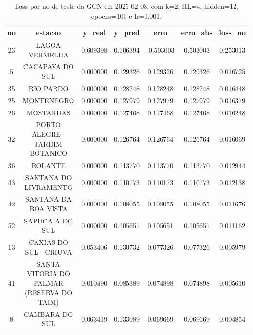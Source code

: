 \begin{table}[h]
\centering
\caption{Loss por no de teste da GCN em 2025-02-08, com k=2, HL=4, hidden=12, epochs=100 e lr=0.001.}
\label{tab:gcn_loss_k2_hl4_h12_e100_d20250208}
\begin{tabular}{ccccccc}
\toprule
no & estacao & y\_real & y\_pred & erro & erro\_abs & loss\_no \\
\midrule
23 & LAGOA VERMELHA & 0.609398 & 0.106394 & -0.503003 & 0.503003 & 0.253013 \\
5 & CACAPAVA DO SUL & 0.000000 & 0.129326 & 0.129326 & 0.129326 & 0.016725 \\
35 & RIO PARDO & 0.000000 & 0.128248 & 0.128248 & 0.128248 & 0.016448 \\
25 & MONTENEGRO & 0.000000 & 0.127979 & 0.127979 & 0.127979 & 0.016379 \\
26 & MOSTARDAS & 0.000000 & 0.127468 & 0.127468 & 0.127468 & 0.016248 \\
32 & PORTO ALEGRE - JARDIM BOTANICO & 0.000000 & 0.126764 & 0.126764 & 0.126764 & 0.016069 \\
36 & ROLANTE & 0.000000 & 0.113770 & 0.113770 & 0.113770 & 0.012944 \\
43 & SANTANA DO LIVRAMENTO & 0.000000 & 0.110173 & 0.110173 & 0.110173 & 0.012138 \\
42 & SANTANA DA BOA VISTA & 0.000000 & 0.108055 & 0.108055 & 0.108055 & 0.011676 \\
52 & SAPUCAIA DO SUL & 0.000000 & 0.105651 & 0.105651 & 0.105651 & 0.011162 \\
13 & CAXIAS DO SUL - CRIUVA & 0.053406 & 0.130732 & 0.077326 & 0.077326 & 0.005979 \\
41 & SANTA VITORIA DO PALMAR (RESERVA DO TAIM) & 0.010490 & 0.085389 & 0.074898 & 0.074898 & 0.005610 \\
8 & CAMBARA DO SUL & 0.063419 & 0.133089 & 0.069669 & 0.069669 & 0.004854 \\
\bottomrule
\end{tabular}
\end{table}
